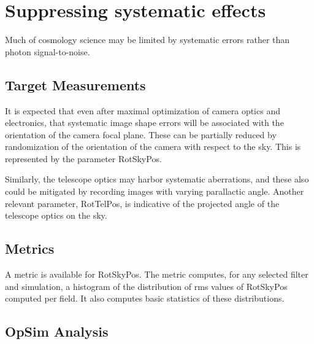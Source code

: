 \section{Suppressing systematic effects}
\def\secname{suppressing}\label{sec:\secname}


Much of cosmology science may be limited by systematic errors rather than photon signal-to-noise.  

\subsection{Target Measurements}

It is expected that even after maximal optimization of camera optics and electronics, that systematic image shape errors will be associated with the orientation of the camera focal plane.  These can be partially reduced by randomization of the orientation of the camera with respect to the sky.  This is represented by the parameter RotSkyPos.  

Similarly, the telescope optics may harbor systematic aberrations, and these also could be mitigated by recording images with varying parallactic angle.  Another relevant parameter, RotTelPos, is indicative of the projected angle of the telescope optics on the sky.  


\subsection{Metrics}

A metric is available for RotSkyPos.  The metric computes, for any selected filter and simulation, a histogram of the distribution of rms values of RotSkyPos computed per field. It also computes basic statistics of these distributions.

\subsection{OpSim Analysis}



